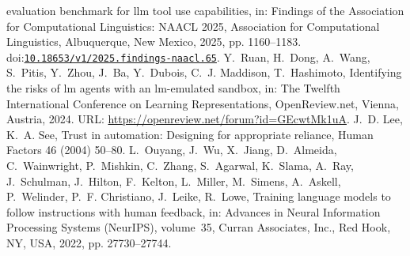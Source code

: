 \documentclass[10pt,a4paper]{article}
\providecommand{\bibinfo}[2]{#2}
\providecommand{\DOIprefix}{doi:}
\providecommand{\URLprefix}{URL: }
\providecommand{\doi}[1]{\href{https://doi.org/#1}{\nolinkurl{#1}}}
\begin{document}
\begin{thebibliography}{24}
{  evaluation benchmark for llm tool use capabilities},
\newblock in: \bibinfo{booktitle}{Findings of the Association for Computational
  Linguistics: NAACL 2025}, \bibinfo{publisher}{Association for Computational
  Linguistics}, \bibinfo{address}{Albuquerque, New Mexico},
  \bibinfo{year}{2025}, pp. \bibinfo{pages}{1160--1183}.
  \DOIprefix\doi{10.18653/v1/2025.findings-naacl.65}.
\bibinfo{author}{Y.~Ruan}, \bibinfo{author}{H.~Dong},
  \bibinfo{author}{A.~Wang}, \bibinfo{author}{S.~Pitis},
  \bibinfo{author}{Y.~Zhou}, \bibinfo{author}{J.~Ba},
  \bibinfo{author}{Y.~Dubois}, \bibinfo{author}{C.~J. Maddison},
  \bibinfo{author}{T.~Hashimoto},
\newblock \bibinfo{title}{Identifying the risks of lm agents with an
  lm-emulated sandbox},
\newblock in: \bibinfo{booktitle}{The Twelfth International Conference on
  Learning Representations}, \bibinfo{publisher}{OpenReview.net},
  \bibinfo{address}{Vienna, Austria}, \bibinfo{year}{2024}. \URLprefix
  \url{https://openreview.net/forum?id=GEcwtMk1uA}.
\bibinfo{author}{J.~D. Lee}, \bibinfo{author}{K.~A. See},
\newblock \bibinfo{title}{Trust in automation: Designing for appropriate
  reliance},
\newblock \bibinfo{journal}{Human Factors} \bibinfo{volume}{46}
  (\bibinfo{year}{2004}) \bibinfo{pages}{50--80}.
\bibinfo{author}{L.~Ouyang}, \bibinfo{author}{J.~Wu},
  \bibinfo{author}{X.~Jiang}, \bibinfo{author}{D.~Almeida},
  \bibinfo{author}{C.~Wainwright}, \bibinfo{author}{P.~Mishkin},
  \bibinfo{author}{C.~Zhang}, \bibinfo{author}{S.~Agarwal},
  \bibinfo{author}{K.~Slama}, \bibinfo{author}{A.~Ray},
  \bibinfo{author}{J.~Schulman}, \bibinfo{author}{J.~Hilton},
  \bibinfo{author}{F.~Kelton}, \bibinfo{author}{L.~Miller},
  \bibinfo{author}{M.~Simens}, \bibinfo{author}{A.~Askell},
  \bibinfo{author}{P.~Welinder}, \bibinfo{author}{P.~F. Christiano},
  \bibinfo{author}{J.~Leike}, \bibinfo{author}{R.~Lowe},
\newblock \bibinfo{title}{Training language models to follow instructions with
  human feedback},
\newblock in: \bibinfo{booktitle}{Advances in Neural Information Processing
  Systems (NeurIPS)}, volume~\bibinfo{volume}{35}, \bibinfo{publisher}{Curran
  Associates, Inc.}, \bibinfo{address}{Red Hook, NY, USA},
  \bibinfo{year}{2022}, pp. \bibinfo{pages}{27730--27744}.

\end{thebibliography}
\end{document}
